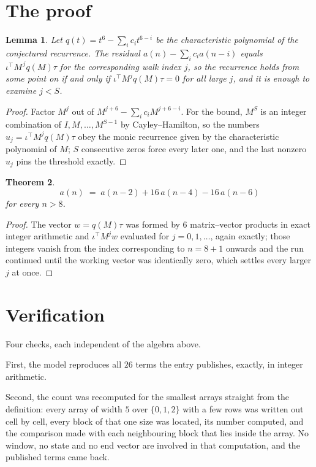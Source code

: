 \documentclass[11pt,a4paper]{article}
\theoremstyle{plain}
\newtheorem{theorem}{Theorem}
\newtheorem{lemma}[theorem]{Lemma}
\theoremstyle{definition}
\begin{document}
\section{The proof}

\begin{lemma}\label{lem:crit}
Let $q(t)=t^{6}-\sum_i c_it^{6-i}$ be the characteristic polynomial of the
conjectured recurrence. The residual $a(n)-\sum_ic_ia(n-i)$ equals
$\iota^{\!\top}M^{\,j}q(M)\tau$ for the corresponding walk index $j$, so the recurrence
holds from some point on if and only if $\iota^{\!\top}M^{j}q(M)\tau=0$ for all large $j$,
and it is enough to examine $j<S$.
\end{lemma}

\begin{proof}
Factor $M^{j}$ out of $M^{j+6}-\sum_ic_iM^{j+6-i}$. For the bound, $M^{S}$
is an integer combination of $I,M,\dots,M^{S-1}$ by Cayley--Hamilton, so the numbers
$u_j=\iota^{\!\top}M^{j}q(M)\tau$ obey the monic recurrence given by the characteristic
polynomial of $M$; $S$ consecutive zeros force every later one, and the last nonzero $u_j$
pins the threshold exactly.
\end{proof}

\begin{theorem}
\[
a(n)\;=\;a(n-2) + 16\,a(n-4) - 16\,a(n-6)
\]
for every $n>8$.
\end{theorem}

\begin{proof}
The vector $w=q(M)\tau$ was formed by $6$ matrix--vector products in exact integer
arithmetic and $\iota^{\!\top}M^{j}w$ evaluated for $j=0,1,\dots$, again exactly; those
integers vanish from the index corresponding to $n=8+1$ onwards and the run continued
until the working vector was identically zero, which settles every larger $j$ at once.
\end{proof}

\section{Verification}

Four checks, each independent of the algebra above.

First, the model reproduces all $26$ terms the entry publishes, exactly, in integer
arithmetic.

Second, the count was recomputed for the smallest arrays straight from the definition: every
array of width $5$ over $\{0,1,2\}$ with a few rows was written out cell by cell, every block of
that one size was located, its number computed, and the comparison made with each neighbouring block
that lies inside the array. No window, no state and no end vector are involved in that
computation, and the published terms came back.
\end{document}
